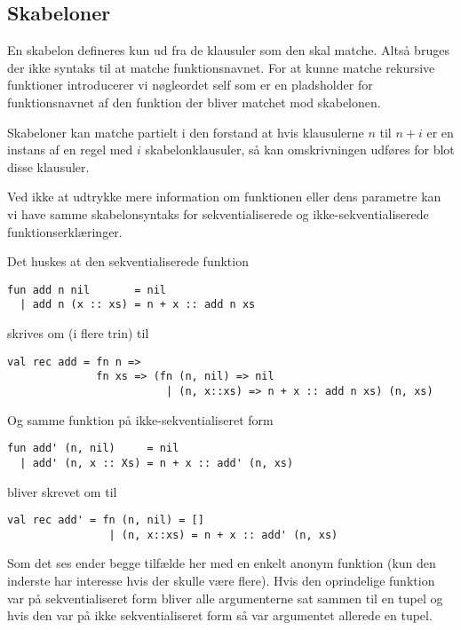 \documentclass[oneside]{memoir}
\theoremstyle{definition}
\begin{document}
\subsection{Skabeloner}

En skabelon defineres kun ud fra de klausuler som den skal matche. Altså
bruges der ikke syntaks til at matche funktionsnavnet. For at kunne matche
rekursive funktioner introducerer vi nøgleordet \textsf{self} som er en
pladsholder for funktionsnavnet af den funktion der bliver matchet mod
skabelonen.


Skabeloner kan matche partielt i den forstand at hvis klausulerne $n$ til $n +
i$ er en instans af en regel med $i$ skabelonklausuler, så kan omskrivningen
udføres for blot disse klausuler.

Ved ikke at udtrykke mere information om funktionen eller dens parametre kan vi
have samme skabelonsyntaks for sekventialiserede og ikke-sekventialiserede
funktionserklæringer.

Det huskes at den sekventialiserede funktion

\begin{verbatim}
fun add n nil       = nil
  | add n (x :: xs) = n + x :: add n xs
\end{verbatim}

skrives om (i flere trin) til

\begin{verbatim}
val rec add = fn n => 
              fn xs => (fn (n, nil) => nil
                         | (n, x::xs) => n + x :: add n xs) (n, xs)
\end{verbatim}

Og samme funktion på ikke-sekventialiseret form

\begin{verbatim}
fun add' (n, nil)     = nil
  | add' (n, x :: Xs) = n + x :: add' (n, xs)
\end{verbatim}

bliver skrevet om til

\begin{verbatim}
val rec add' = fn (n, nil) = []
                | (n, x::xs) = n + x :: add' (n, xs)
\end{verbatim}

Som det ses ender begge tilfælde her med en enkelt anonym funktion (kun den inderste
har interesse hvis der skulle være flere). Hvis den oprindelige funktion var på
sekventialiseret form bliver alle argumenterne sat sammen til en tupel og hvis
den var på ikke sekventialiseret form så var argumentet allerede en tupel.
\end{document}
